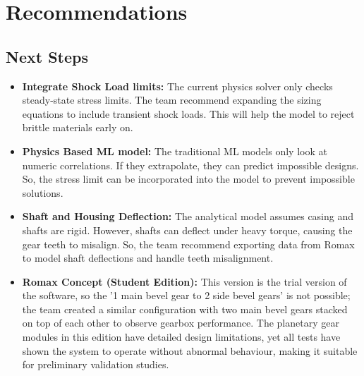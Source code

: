 \chapter{Recommendations}
\section{Next Steps}
	\begin{itemize}
		\item \textbf{Integrate Shock Load limits:} The current physics solver only checks steady-state stress limits. 
		The team recommend expanding the sizing equations to include transient shock loads. This will help the model 
		to reject brittle materials early on.
		\item \textbf{Physics Based ML model:} The traditional ML models only look at numeric correlations. 
		If they extrapolate, they can predict impossible designs. So, the stress limit can be 
		incorporated into the model to prevent impossible solutions.
		\item \textbf{Shaft and Housing Deflection:} The analytical model assumes casing and shafts are rigid. 
		However, shafts can deflect under heavy torque, causing the gear teeth to misalign. 
		So, the team recommend exporting data from Romax to model shaft deflections and handle teeth misalignment.
		\item \textbf{Romax Concept (Student Edition):} This version is the trial version of the software, 
		so the '1 main bevel gear to 2 side bevel gears' is not possible; the team created a similar 
		configuration with two main bevel gears stacked on top of each other to observe gearbox performance. 
		The planetary gear modules in this edition have detailed design limitations, yet all tests have shown 
		the system to operate without abnormal behaviour, making it suitable for preliminary validation studies.
	\end{itemize}